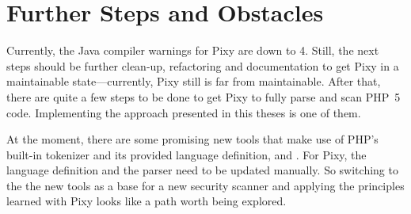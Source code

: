 \section{Further Steps and Obstacles}

Currently, the Java compiler warnings for Pixy are down to 4. Still, the next steps should be further clean-up, refactoring and documentation to get Pixy in a maintainable state---currently, Pixy still is far from maintainable. After that, there are quite a few steps to be done to get Pixy to fully parse and scan PHP~5 code. Implementing the approach presented in this theses is one of them.

At the moment, there are some promising new tools that make use of PHP's built-in tokenizer and its provided language definition, \eg \cite{php-parser-popov} and \cite{php-analyzer}. For Pixy, the language definition and the parser need to be updated manually. So switching to the the new tools as a base for a new security scanner and applying the principles learned with Pixy looks like a path worth being explored.
